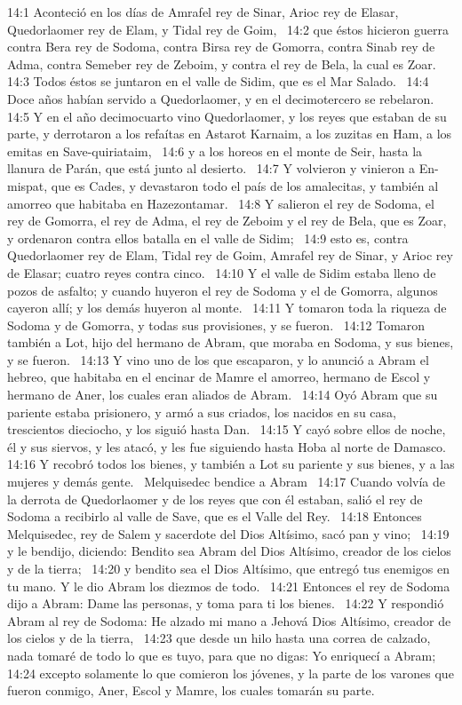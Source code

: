 14:1 Aconteció en los días de Amrafel rey de Sinar, Arioc rey de Elasar, Quedorlaomer rey de Elam, y Tidal rey de Goim,  
14:2 que éstos hicieron guerra contra Bera rey de Sodoma, contra Birsa rey de Gomorra, contra Sinab rey de Adma, contra Semeber rey de Zeboim, y contra el rey de Bela, la cual es Zoar.  
14:3 Todos éstos se juntaron en el valle de Sidim, que es el Mar Salado.  
14:4 Doce años habían servido a Quedorlaomer, y en el decimotercero se rebelaron.  
14:5 Y en el año decimocuarto vino Quedorlaomer, y los reyes que estaban de su parte, y derrotaron a los refaítas en Astarot Karnaim, a los zuzitas en Ham, a los emitas en Save-quiriataim,  
14:6 y a los horeos en el monte de Seir, hasta la llanura de Parán, que está junto al desierto.  
14:7 Y volvieron y vinieron a En-mispat, que es Cades, y devastaron todo el país de los amalecitas, y también al amorreo que habitaba en Hazezontamar.  
14:8 Y salieron el rey de Sodoma, el rey de Gomorra, el rey de Adma, el rey de Zeboim y el rey de Bela, que es Zoar, y ordenaron contra ellos batalla en el valle de Sidim;  
14:9 esto es, contra Quedorlaomer rey de Elam, Tidal rey de Goim, Amrafel rey de Sinar, y Arioc rey de Elasar; cuatro reyes contra cinco.  
14:10 Y el valle de Sidim estaba lleno de pozos de asfalto; y cuando huyeron el rey de Sodoma y el de Gomorra, algunos cayeron allí; y los demás huyeron al monte.  
14:11 Y tomaron toda la riqueza de Sodoma y de Gomorra, y todas sus provisiones, y se fueron.  
14:12 Tomaron también a Lot, hijo del hermano de Abram, que moraba en Sodoma, y sus bienes, y se fueron.  
14:13 Y vino uno de los que escaparon, y lo anunció a Abram el hebreo, que habitaba en el encinar de Mamre el amorreo, hermano de Escol y hermano de Aner, los cuales eran aliados de Abram.  
14:14 Oyó Abram que su pariente estaba prisionero, y armó a sus criados, los nacidos en su casa, trescientos dieciocho, y los siguió hasta Dan.  
14:15 Y cayó sobre ellos de noche, él y sus siervos, y les atacó, y les fue siguiendo hasta Hoba al norte de Damasco.  
14:16 Y recobró todos los bienes, y también a Lot su pariente y sus bienes, y a las mujeres y demás gente.  
Melquisedec bendice a Abram  
14:17 Cuando volvía de la derrota de Quedorlaomer y de los reyes que con él estaban, salió el rey de Sodoma a recibirlo al valle de Save, que es el Valle del Rey.  
14:18 Entonces Melquisedec, rey de Salem y sacerdote del Dios Altísimo, sacó pan y vino;  
14:19 y le bendijo, diciendo: Bendito sea Abram del Dios Altísimo, creador de los cielos y de la tierra;  
14:20 y bendito sea el Dios Altísimo, que entregó tus enemigos en tu mano. Y le dio Abram los diezmos de todo.  
14:21 Entonces el rey de Sodoma dijo a Abram: Dame las personas, y toma para ti los bienes.  
14:22 Y respondió Abram al rey de Sodoma: He alzado mi mano a Jehová Dios Altísimo, creador de los cielos y de la tierra,  
14:23 que desde un hilo hasta una correa de calzado, nada tomaré de todo lo que es tuyo, para que no digas: Yo enriquecí a Abram;  
14:24 excepto solamente lo que comieron los jóvenes, y la parte de los varones que fueron conmigo, Aner, Escol y Mamre, los cuales tomarán su parte.  
